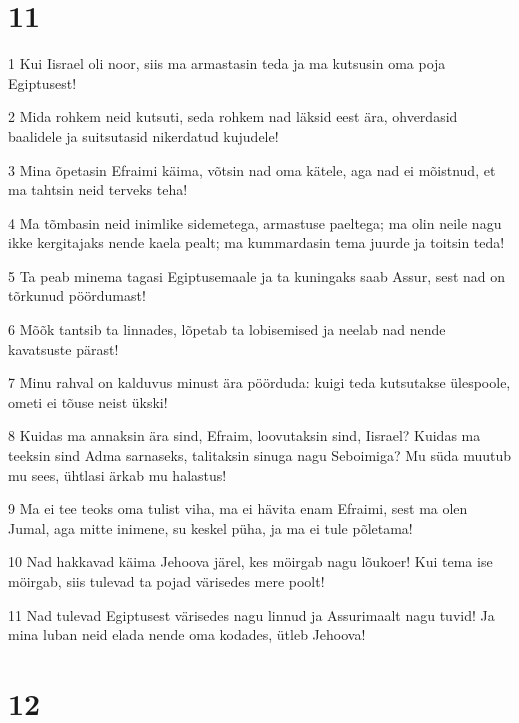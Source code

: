 \chapter{11}

\par 1 Kui Iisrael oli noor, siis ma armastasin teda ja ma kutsusin oma poja Egiptusest!
\par 2 Mida rohkem neid kutsuti, seda rohkem nad läksid eest ära, ohverdasid baalidele ja suitsutasid nikerdatud kujudele!
\par 3 Mina õpetasin Efraimi käima, võtsin nad oma kätele, aga nad ei mõistnud, et ma tahtsin neid terveks teha!
\par 4 Ma tõmbasin neid inimlike sidemetega, armastuse paeltega; ma olin neile nagu ikke kergitajaks nende kaela pealt; ma kummardasin tema juurde ja toitsin teda!
\par 5 Ta peab minema tagasi Egiptusemaale ja ta kuningaks saab Assur, sest nad on tõrkunud pöördumast!
\par 6 Mõõk tantsib ta linnades, lõpetab ta lobisemised ja neelab nad nende kavatsuste pärast!
\par 7 Minu rahval on kalduvus minust ära pöörduda: kuigi teda kutsutakse ülespoole, ometi ei tõuse neist ükski!
\par 8 Kuidas ma annaksin ära sind, Efraim, loovutaksin sind, Iisrael? Kuidas ma teeksin sind Adma sarnaseks, talitaksin sinuga nagu Seboimiga? Mu süda muutub mu sees, ühtlasi ärkab mu halastus!
\par 9 Ma ei tee teoks oma tulist viha, ma ei hävita enam Efraimi, sest ma olen Jumal, aga mitte inimene, su keskel püha, ja ma ei tule põletama!
\par 10 Nad hakkavad käima Jehoova järel, kes möirgab nagu lõukoer! Kui tema ise möirgab, siis tulevad ta pojad värisedes mere poolt!
\par 11 Nad tulevad Egiptusest värisedes nagu linnud ja Assurimaalt nagu tuvid! Ja mina luban neid elada nende oma kodades, ütleb Jehoova!

\chapter{12}

